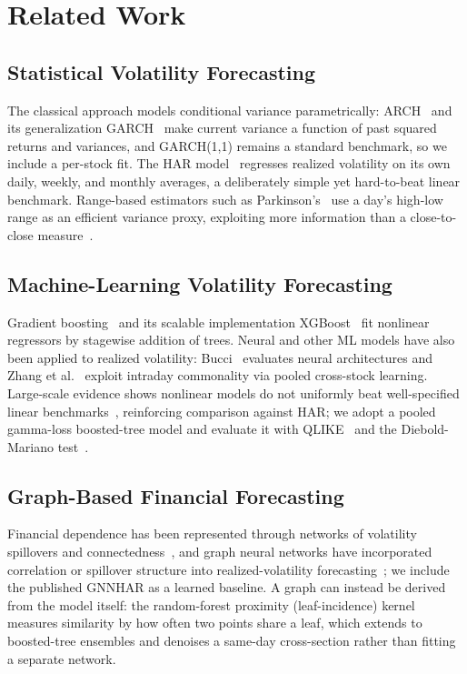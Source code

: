 \documentclass[runningheads]{llncs}
\begin{document}
\section{Related Work}

\subsection{Statistical Volatility Forecasting}
The classical approach models conditional variance parametrically: ARCH~\cite{engle1982} and its
generalization GARCH~\cite{bollerslev1986} make current variance a function of past squared returns and
variances, and GARCH(1,1) remains a standard benchmark, so we include a per-stock fit. The HAR
model~\cite{corsi2009} regresses realized volatility on its own daily, weekly, and monthly averages, a
deliberately simple yet hard-to-beat linear benchmark. Range-based estimators such as
Parkinson's~\cite{parkinson1980} use a day's high-low range as an efficient variance proxy, exploiting
more information than a close-to-close measure~\cite{alizadeh2002}.

\subsection{Machine-Learning Volatility Forecasting}
Gradient boosting~\cite{friedman2001} and its scalable implementation XGBoost~\cite{chen2016} fit
nonlinear regressors by stagewise addition of trees. Neural and other ML models have also been applied to
realized volatility: Bucci~\cite{bucci2020} evaluates neural architectures and Zhang et
al.~\cite{zhang2024ml} exploit intraday commonality via pooled cross-stock learning. Large-scale evidence
shows nonlinear models do not uniformly beat well-specified linear benchmarks~\cite{branco2024},
reinforcing comparison against HAR; we adopt a pooled gamma-loss boosted-tree model and evaluate it with
QLIKE~\cite{patton2011} and the Diebold-Mariano test~\cite{dm1995,hln1997}.

\subsection{Graph-Based Financial Forecasting}
Financial dependence has been represented through networks of volatility spillovers and connectedness~\cite{diebold2014},
and graph neural networks have incorporated correlation or spillover structure into realized-volatility
forecasting~\cite{gnnhar2024}; we include the published GNNHAR as a learned baseline. A graph can instead
be derived from the model itself: the random-forest proximity (leaf-incidence) kernel~\cite{rhodes2023}
measures similarity by how often two points share a leaf, which extends to boosted-tree ensembles and
denoises a same-day cross-section rather than fitting a separate network.
\end{document}

